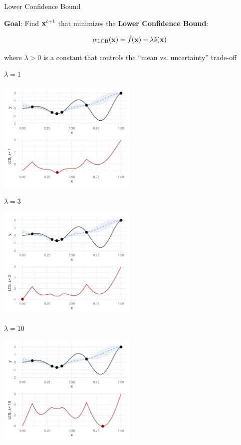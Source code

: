 \documentclass[11pt,compress,t,notes=noshow, xcolor=table]{beamer}
\begin{document}
\begin{vbframe}{Lower Confidence Bound}

\textbf{Goal}: Find $\mathbf{x}^{t+1}$ that minimizes the \textbf{Lower Confidence Bound}:

$$
  \alpha_{\text{LCB}}(\mathbf{x}) = \hat{f}(\mathbf{x}) - \lambda \hat{s}(\mathbf{x})
$$

where $\lambda > 0$ is a constant that controls the \enquote{mean vs. uncertainty} trade-off

\framebreak

$\lambda = 1$

\begin{center}
  \includegraphics[width = 0.5\textwidth]{figure_man/bayesian_loop_lcb_0.png}
\end{center}

\framebreak

$\lambda = 3$

\begin{center}
  \includegraphics[width = 0.5\textwidth]{figure_man/bayesian_loop_lcb_1.png}
\end{center}

\framebreak

$\lambda = 10$

\begin{center}
  \includegraphics[width = 0.5\textwidth]{figure_man/bayesian_loop_lcb_2.png}
\end{center}

\end{vbframe}
\end{document}
